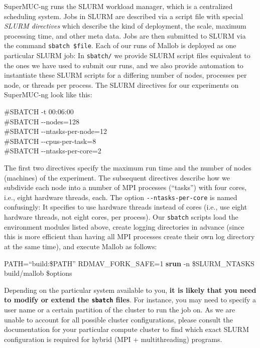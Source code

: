 \documentclass[runningheads]{article}
\numberwithin{dummy}{subsection}
\begin{document}
SuperMUC-ng runs the SLURM workload manager, which is a centralized scheduling system.
Jobs in SLURM are described via a script file with special \textit{SLURM directives} which describe the kind of deployment, the scale, maximum processing time, and other meta data.
Jobs are then submitted to SLURM via the command \texttt{sbatch \$file}.
Each of our runs of Mallob is deployed as one particular SLURM job: In \texttt{sbatch/} we provide SLURM script files equivalent to the ones we have used to submit our runs, and we also provide automation to instantiate these SLURM scripts for a differing number of nodes, processes per node, or threads per process.
The SLURM directives for our experiments on SuperMUC-ng look like this:
\begin{ttfenv}
\#SBATCH -t 00:06:00\\
\#SBATCH -{}-nodes=128\\
\#SBATCH -{}-ntasks-per-node=12\\
\#SBATCH -{}-cpus-per-task=8\\
\#SBATCH -{}-ntasks-per-core=2
\end{ttfenv}
The first two directives specify the maximum run time and the number of nodes (machines) of the experiment.
The subsequent directives describe how we subdivide each node into a number of MPI processes (``tasks'') with four cores, i.e., eight hardware threads, each.
The option \texttt{-{}-ntasks-per-core} is named confusingly: It specifies to use hardware threads instead of cores (i.e., use eight hardware threads, not eight cores, per process).
Our \texttt{sbatch} scripts load the environment modules listed above, create logging directories in advance (since this is more efficient than having all MPI processes create their own log directory at the same time), and execute Mallob as follows:
\begin{ttfenv}
PATH=``build:\$PATH'' RDMAV\_FORK\_SAFE=1 \textbf{srun} -n \$SLURM\_NTASKS build/mallob \$options
\end{ttfenv}

Depending on the particular system available to you, \textbf{it is likely that you need to modify or extend the \texttt{sbatch} files}.
For instance, you may need to specify a user name or a certain partition of the cluster to run the job on.
As we are unable to account for all possible cluster configurations, please consult the documentation for your particular compute cluster to find which exact SLURM configuration is required for hybrid (MPI + multithreading) programs.
\end{document}
